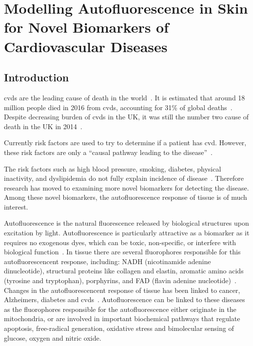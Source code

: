 \chapter{Modelling Autofluorescence in Skin for Novel Biomarkers of Cardiovascular Diseases}
\label{chap:salvo}




\section{Introduction}


\Gls*{cvds} are the leading cause of death in the world~\cite{whodeath}.
It is estimated that around 18 million people died in 2016 from \gls*{cvds}, accounting for 31\% of global deaths~\cite{whodeath}.
Despite decreasing burden of \gls*{cvds} in the UK, it was still the number two cause of death in the UK in 2014~\cite{bhatnagar2016trends}.

Currently risk factors are used to try to determine if a patient has \gls*{cvd}.
However, these risk factors are only a ``causal pathway leading to the disease''~\cite{vasan2006biomarkers}.

The risk factors such as high blood pressure, smoking, diabetes, physical inactivity, and dyslipidemia do not fully explain incidence of disease~\cite{olsen2010assessment,folsom2013classical}.
Therefore research has moved to examining more novel biomarkers for detecting the disease.
Among these novel biomarkers, the autofluorescence response of tissue is of much interest.

Autofluorescence is the natural fluorescence released by biological structures upon excitation by light.
Autofluorescence is particularly attractive as a biomarker as it requires no exogenous dyes, which can be toxic, non-specific, or interfere with biological function~\cite{kollias1998endogenous}.
In tissue there are several fluorophores responsible for this autofluorescencent response, including: NADH (nicotinamide adenine dinucleotide), structural proteins like collagen and elastin, aromatic amino acids (tyrosine and tryptophan), porphyrins, and FAD (flavin adenine nucleotide)~\cite{monici2005cell}.
Changes in the autofluorescencent response of tissue has been linked to cancer, Alzheimers, diabetes and \gls*{cvds}~\cite{drakaki2009laser,pu2013native,ramanujam2000fluorescence,tarnawska2018pilot,van2019skin}.
Autofluorescence can be linked to these diseases as the fluorophores responsible for the autofluorescence either originate in the mitochondria, or are involved in important biochemical pathways that regulate apoptosis, free-radical generation, oxidative stress and bimolecular sensing of glucose, oxygen and nitric oxide.

